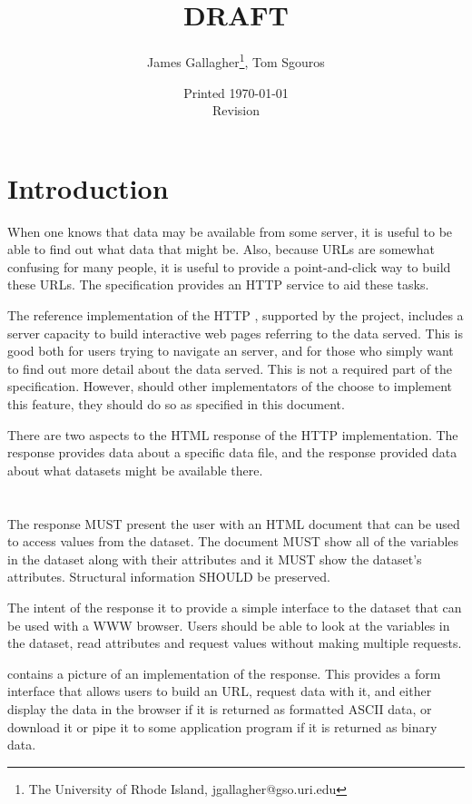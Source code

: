 \documentclass[justify]{dods-paper}
\title{\DAPHTMLTitle\\ DRAFT}
\author{James Gallagher\thanks{The University of Rhode Island,
    jgallagher@gso.uri.edu}, Tom Sgouros}
\date{Printed \today \\ Revision \rcsInfoRevision}
\begin{document}
\maketitle
\T\tableofcontents

\section{Introduction}

When one knows that data may be available from some \opendap server,
it is useful to be able to find out what data that might be.  Also,
because \DAP URLs are somewhat confusing for many people, it is useful
to provide a point-and-click way to build these URLs.  The \opendap
specification provides an HTTP service to aid these tasks. 

The reference implementation of the HTTP \DAP, supported by the
\opendap project, includes a server capacity to build interactive web
pages referring to the data served. This is good both for users trying
to navigate an \opendap server, and for those who simply want to find
out more detail about the data served.  This is not a required part of
the \DAP specification.  However, should other implementators of the
\DAP choose to implement this feature, they should do so as specified
in this document.

There are two aspects to the HTML response of the HTTP implementation.
The \HTML response provides data about a specific data file, and the
\DIR response provided data about what datasets might be available
there.

\section{\HTML}
\label{sec-html}

The \HTML response MUST present the user with an HTML document
that can be used to access values from the dataset. The document MUST show
all of the variables in the dataset along with their attributes and it MUST
show the dataset's attributes. Structural information SHOULD be preserved. 

The intent of the \HTML response it to provide a simple interface to
the dataset that can be used with a WWW browser.  Users should be able
to look at the variables in the dataset, read attributes and request
values without making multiple requests.

 contains a picture of an implementation of the
\HTML response.  This provides a form interface that allows users to
build an \opendap URL, request data with it, and either display the
data in the browser if it is returned as formatted ASCII data, or
download it or pipe it to some application program if it is returned
as binary data.
\end{document}

